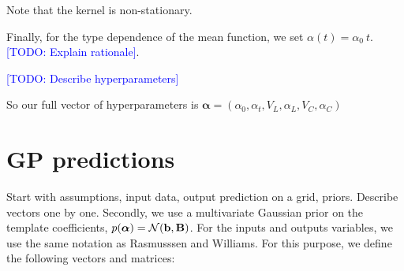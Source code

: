 \documentclass[aps,prd,showpacs,superscriptaddress,groupedaddress]{revtex4}  %
\newcommand{\todo}[1]{\textcolor{blue}{[TODO: #1]}}
\begin{document}
Note that the kernel is non-stationary.

Finally, for the type dependence of the mean function, we set $\alpha(t) = \alpha_0 \ t$. \todo{Explain rationale}.

\todo{Describe hyperparameters}

So our full vector of hyperparameters is $\bm{\alpha} = (\alpha_0, \alpha_t, V_L,  \alpha_L, V_C, \alpha_C)$



\section{GP predictions}\label{sec:gppred}

Start with assumptions, input data, output prediction on a grid, priors. Describe vectors one by one.
Secondly, we use a multivariate Gaussian prior on the template coefficients, $p(\bm{\alpha}) = \mathcal{N}(\vec{b}, \mat{B})$. For the inputs and outputs variables, we use the same notation as Rasmusssen and Williams. For this purpose, we define the following vectors and matrices:



\end{document}
